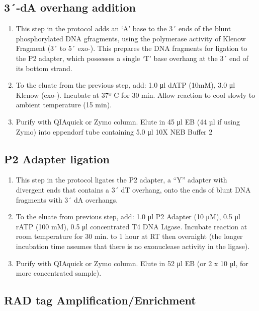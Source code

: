 \documentclass[
  letterpaper,
  DIV=11,
  numbers=noendperiod]{scrreprt}
\providecommand{\tightlist}{%
  \setlength{\itemsep}{0pt}\setlength{\parskip}{0pt}}\usepackage{longtable,booktabs,array}
\begin{document}
\hypertarget{da-overhang-addition-1}{%
\subsection{3´-dA overhang addition}\label{da-overhang-addition-1}}

\begin{enumerate}
\def\labelenumi{\arabic{enumi}.}
\tightlist
\item
  This step in the protocol adds an `A' base to the 3´ ends of the blunt
  phosphorylated DNA gfragments, using the polymerase activity of Klenow
  Fragment (3´ to 5´ exo-). This prepares the DNA fragments for ligation
  to the P2 adapter, which possesses a single `T' base overhang at the
  3´ end of its bottom strand.
\item
  To the eluate from the previous step, add: 1.0 μl dATP (10mM), 3.0 μl
  Klenow (exo-). Incubate at 37º C for 30 min. Allow reaction to cool
  slowly to ambient temperature (15 min).
\item
  Purify with QIAquick or Zymo column. Elute in 45 μl EB (44 µl if using
  Zymo) into eppendorf tube containing 5.0 μl 10X NEB Buffer 2
\end{enumerate}

\hypertarget{p2-adapter-ligation-1}{%
\subsection{P2 Adapter ligation}\label{p2-adapter-ligation-1}}

\begin{enumerate}
\def\labelenumi{\arabic{enumi}.}
\tightlist
\item
  This step in the protocol ligates the P2 adapter, a ``Y'' adapter with
  divergent ends that contains a 3´ dT overhang, onto the ends of blunt
  DNA fragments with 3´ dA overhangs.
\item
  To the eluate from previous step, add: 1.0 μl P2 Adapter (10 μM), 0.5
  μl rATP (100 mM), 0.5 μl concentrated T4 DNA Ligase. Incubate reaction
  at room temperature for 30 min. to 1 hour at RT then overnight (the
  longer incubation time assumes that there is no exonuclease activity
  in the ligase).
\item
  Purify with QIAquick or Zymo column. Elute in 52 μl EB (or 2 x 10 µl,
  for more concentrated sample).
\end{enumerate}

\hypertarget{rad-tag-amplificationenrichment-1}{%
\subsection{RAD tag
Amplification/Enrichment}\label{rad-tag-amplificationenrichment-1}}
\end{document}
